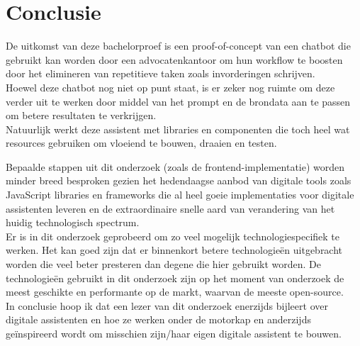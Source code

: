 
\chapter{Conclusie}%
\label{ch:conclusie}


De uitkomst van deze bachelorproef is een proof-of-concept van een chatbot die gebruikt kan worden door een advocatenkantoor om hun workflow te boosten 
door het elimineren van repetitieve taken zoals invorderingen schrijven.\\  

Hoewel deze chatbot nog niet op punt staat, is er zeker nog ruimte om deze verder uit te werken door middel van
het prompt en de brondata aan te passen om betere resultaten te verkrijgen.\\ 

Natuurlijk werkt deze assistent met libraries en componenten die toch heel wat resources gebruiken om vloeiend te bouwen, draaien en testen. 

Bepaalde stappen uit dit onderzoek (zoals de frontend-implementatie) worden minder breed besproken gezien het hedendaagse aanbod van digitale tools zoals JavaScript libraries en frameworks die 
al heel goeie implementaties voor digitale assistenten leveren en de extraordinaire snelle aard van verandering van het huidig technologisch spectrum. \\ 

Er is in dit onderzoek geprobeerd om zo veel mogelijk technologiespecifiek te werken. 
Het kan goed zijn dat er binnenkort betere technologieën uitgebracht worden die veel beter presteren dan degene die hier gebruikt worden. 
De technologieën gebruikt in dit onderzoek zijn op het moment van onderzoek de meest geschikte en performante op de markt, waarvan de meeste open-source. \\

In conclusie hoop ik dat een lezer van dit onderzoek enerzijds bijleert over digitale assistenten en hoe ze werken onder de motorkap en anderzijds 
geïnspireerd wordt om misschien zijn/haar eigen digitale assistent te bouwen.  
